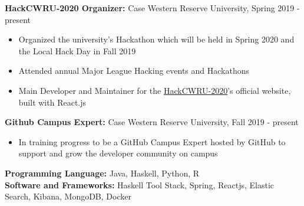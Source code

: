 \documentclass[a4paper,11pt]{article}
\begin{document}
\begin{flushleft}
	
	\textbf{HackCWRU-2020 Organizer: } Case Western Reserve University, Spring 2019 - 
	present
	\vspace{-\topsep}
	\begin{itemize}
		\setlength{\parskip}{2pt}
		\setlength{\itemsep}{0pt plus 1pt}
		\item Organized the university's Hackathon which will be held in Spring 2020 and the Local Hack Day in Fall 2019 \\
		\item Attended annual Major League Hacking events and Hackathons
		\item Main Developer and Maintainer for the \href{https://hackcwru.github.io/HackCWRU2020-Website/}{HackCWRU-2020}'s official website, built with React.js
	\end{itemize}
	
	
	\textbf{Github Campus Expert: } Case Western Reserve University, Fall 2019 - present
	\vspace{-\topsep}
		\begin{itemize}
			\setlength{\parskip}{2pt}
			\setlength{\itemsep}{0pt plus 10pt}
			\item In training progress to be a GitHub Campus Expert hosted by GitHub to support and grow the developer community on campus
		\end{itemize}
\centering{\noindent\makebox{\rule{8cm}{1.5pt}}}
\end{flushleft} 
\begin{flushleft}
	\textbf{Programming Language:} Java, Haskell, Python, R \\ 
	\doublespacing
	\textbf{Software and Frameworks:} Haskell Tool Stack, Spring, Reactjs, Elastic Search, Kibana, MongoDB, Docker \\
	\vspace{-\topsep}
	
\end{flushleft}
\end{document}
